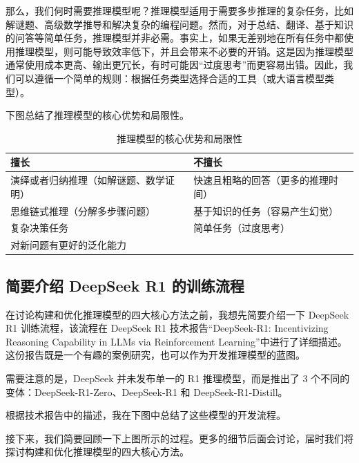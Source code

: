 \documentclass[lang=cn,newtx,10pt,scheme=chinese]{elegantbook}
\begin{document}
那么，我们何时需要推理模型呢？推理模型适用于需要多步推理的复杂任务，比如解谜题、高级数学推导和解决复杂的编程问题。然而，对于总结、翻译、基于知识的问答等简单任务，推理模型并非必需。事实上，如果无差别地在所有任务中都使用推理模型，则可能导致效率低下，并且会带来不必要的开销。这是因为推理模型通常使用成本更高、输出更冗长，有时可能因``过度思考''而更容易出错。因此，我们可以遵循一个简单的规则：根据任务类型选择合适的工具（或大语言模型类型）。

下图总结了推理模型的核心优势和局限性。

\begin{table}[!ht]
\centering
\begin{tabular}{|l|l|}
\hline
\rowcolor[HTML]{FFFFC7} 
擅长                  & 不擅长               \\ \hline
演绎或者归纳推理（如解谜题、数学证明） & 快速且粗略的回答（更多的推理时间） \\ \hline
思维链式推理（分解多步骤问题）     & 基于知识的任务（容易产生幻觉）   \\ \hline
复杂决策任务              & 简单任务（过度思考）        \\ \hline
对新问题有更好的泛化能力        &                   \\ \hline
\end{tabular}
\caption{推理模型的核心优势和局限性}\label{tbl:reasoning-model-good-bad}
\end{table}

\subsection{简要介绍 DeepSeek R1 的训练流程}

在讨论构建和优化推理模型的四大核心方法之前，我想先简要介绍一下 DeepSeek R1 训练流程，该流程在 DeepSeek R1 技术报告``DeepSeek-R1: Incentivizing Reasoning Capability in LLMs via Reinforcement Learning''中进行了详细描述。这份报告既是一个有趣的案例研究，也可以作为开发推理模型的蓝图。

需要注意的是，DeepSeek 并未发布单一的 R1 推理模型，而是推出了 3 个不同的变体：DeepSeek-R1-Zero、DeepSeek-R1 和 DeepSeek-R1-Distill。

根据技术报告中的描述，我在下图中总结了这些模型的开发流程。

接下来，我们简要回顾一下上图所示的过程。更多的细节后面会讨论，届时我们将探讨构建和优化推理模型的四大核心方法。
\end{document}
